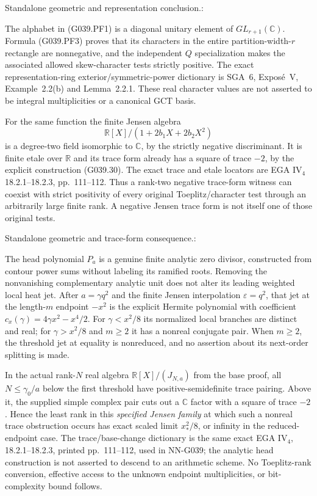 \begin{geometricstatement}[NN-G039]
Standalone geometric and representation conclusion.:

The alphabet in (G039.PF1) is a diagonal unitary element of
$GL_{r+1}(\mathbb C)$. Formula (G039.PF3) proves that its
characters in the entire partition-width-$r$ rectangle are
nonnegative, and the independent $Q$ specialization makes
the associated allowed skew-character tests strictly positive.
The exact representation-ring exterior/symmetric-power
dictionary is SGA~6, Expos\'e~V, Example~2.2(b) and
Lemma~2.2.1. These real character values are not asserted to
be integral multiplicities or a canonical GCT basis.

For the same function the finite Jensen algebra
\[
        \mathbb R[X]/(1+2b_1X+2b_2X^2)
 \tag{G039.PF6}
\]
is a degree-two field isomorphic to $\mathbb C$, by the
strictly negative discriminant. It is finite etale over
$\mathbb R$ and its trace form already has a square of
trace $-2$, by the explicit construction (G039.30).
The exact trace and etale locators are EGA IV$_4$
18.2.1--18.2.3, pp.~111--112. Thus a rank-two negative
trace-form witness can coexist with strict positivity of
every original Toeplitz/character test through an arbitrarily
large finite rank. A negative Jensen trace form is not itself
one of those original tests.


Standalone geometric and trace-form consequence.:

The head polynomial $P_a$ is a genuine finite analytic zero divisor,
constructed from contour power sums without labeling its ramified
roots. Removing the nonvanishing complementary analytic unit does
not alter its leading weighted local heat jet. After $a=\gamma q^2$
and the finite Jensen interpolation $\varepsilon=q^2$, that jet at
the length-$m$ endpoint $-x^2$ is the explicit Hermite polynomial
with coefficient $c_x(\gamma)=4\gamma x^2-x^4/2$. For
$\gamma<x^2/8$ its normalized local branches are distinct and real;
for $\gamma>x^2/8$ and $m\ge2$ it has a nonreal conjugate pair.
When $m\ge2$, the threshold jet at equality is nonreduced, and no
assertion about its next-order splitting is made.

In the actual rank-$N$ real algebra $\mathbb R[X]/(J_{N,a})$ from
the base proof, all $N\le\gamma_0/a$ below the first threshold have
positive-semidefinite trace pairing. Above it, the supplied simple
complex pair cuts out a $\mathbb C$ factor with a square of trace
$-2$. Hence the least rank in this \emph{specified Jensen family}
at which such a nonreal trace obstruction occurs has exact scaled
limit $x_*^2/8$, or infinity in the reduced-endpoint case. The
trace/base-change dictionary is the same exact EGA IV$_4$,
18.2.1--18.2.3, printed pp.~111--112, used in NN-G039; the analytic
head construction is not asserted to descend to an arithmetic
scheme. No Toeplitz-rank conversion, effective access to the
unknown endpoint multiplicities, or bit-complexity bound follows.



\end{geometricstatement}
